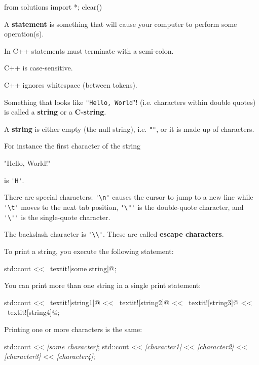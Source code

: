 \begin{python0}
from solutions import *; clear()
\end{python0}

A \textbf{statement} is something that will cause your computer to perform some operation(s).

In C++ statements must terminate with a semi-colon.

C++ is case-sensitive. 

C++ ignores whitespace (between tokens).

Something that looks like \verb!"Hello, World!\n"! (i.e. characters within double quotes) is called a \textbf{string} or a \textbf{C-string}.

A \textbf{string} is either empty (the null string), i.e. \verb!""!, or it is made up of characters. 

For instance the first character of the string
\begin{console}[frame=none]
 
    "Hello, World!\n"

\end{console}
is \verb!'H'!.

There are special characters: 
\verb!'\n'! causes the cursor to jump to a new line while 
\verb!'\t'! moves to the next tab position, 
\verb!'\"'! is the double-quote character, 
and \verb!'\''! is the single-quote character. 

The backslash character is \verb!'\\'!. These are called \textbf{escape characters}.

To print a string, you execute the following statement:
\begin{console}[frame=none, commandchars=\~\!\@]

        std::cout << ~textit![some string]@;

\end{console}
You can print more than one string in a single print statement:
\begin{console}[frame=none, commandchars=\~\!\@]

        std::cout << ~textit![string1]@ << ~textit![string2]@
                  << ~textit![string3]@ << ~textit![string4]@;

\end{console}
Printing one or more characters is the same:
\begin{console}[frame=none, commandchars=\\\{\}]

        std::cout << \textit{[some character]};
        std::cout << \textit{[character1]} << \textit{[character2]}
                  << \textit{[character3]} << \textit{[character4]};

\end{console}

